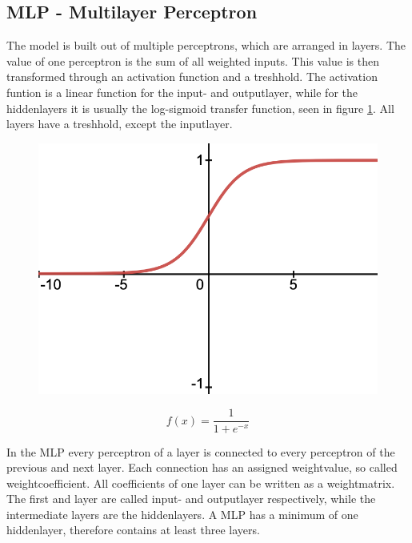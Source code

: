 \documentclass[11pt]{scrartcl}
\begin{document}
	\subsection{MLP - Multilayer Perceptron}
	
	The model is built out of multiple perceptrons, which are arranged in layers. The value of one perceptron is the sum of all weighted inputs. This value is then transformed through an activation function and a treshhold. The activation funtion is a linear function for the input- and outputlayer, while for the hiddenlayers it is usually the log-sigmoid transfer function, seen in figure \ref{fig:log-sigmoid function}. All layers have a treshhold, except the inputlayer. 
	
	\begin{figure}[H]
	\centering
	\begin{minipage}{.5\textwidth}
	  \centering
	  \includegraphics[width=0.75\linewidth]{figures/log-sigmoid.png}
	\end{minipage}%
	\begin{minipage}{.5\textwidth}
	  \centering
		\begin{equation*}
			f(x) = \frac{1}{1 +e^{-x}}
		\end{equation*}
	\end{minipage}
	\label{fig:log-sigmoid function}
	\end{figure}
	
	In the MLP every perceptron of a layer is connected to every perceptron of the previous and next layer. Each connection has an assigned weightvalue, so called weightcoefficient. All coefficients of one layer can be written as a weightmatrix. The first and layer are called input- and outputlayer respectively, while the intermediate layers are the hiddenlayers. A MLP has a minimum of one hiddenlayer, therefore contains at least three layers.
	
\end{document}
